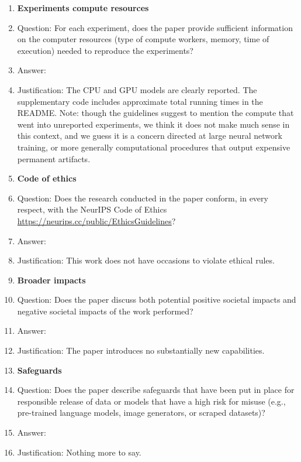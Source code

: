 \begin{enumerate}
	\item {\bf Experiments compute resources}
	\item[] Question: For each experiment, does the paper provide sufficient information on the computer resources (type of compute workers, memory, time of execution) needed to reproduce the experiments?
	\item[] Answer: \answerYes{} %
	\item[] Justification: The CPU and GPU models are clearly reported. The
	      supplementary code includes approximate total running times in the README.
	      Note: though the guidelines suggest to mention the compute that went into
	      unreported experiments, we think it does not make much sense in this
	      context, and we guess it is a concern directed at large neural network
	      training, or more generally computational procedures that output expensive
	      permanent artifacts.

	\item {\bf Code of ethics}
	\item[] Question: Does the research conducted in the paper conform, in every respect, with the NeurIPS Code of Ethics \url{https://neurips.cc/public/EthicsGuidelines}?
	\item[] Answer: \answerYes{} %
	\item[] Justification: This work does not have occasions to violate ethical rules.

	\item {\bf Broader impacts}
	\item[] Question: Does the paper discuss both potential positive societal impacts and negative societal impacts of the work performed?
	\item[] Answer: \answerNo{} %
	\item[] Justification: The paper introduces no substantially new capabilities.

	\item {\bf Safeguards}
	\item[] Question: Does the paper describe safeguards that have been put in place for responsible release of data or models that have a high risk for misuse (e.g., pre-trained language models, image generators, or scraped datasets)?
	\item[] Answer: \answerNA{} %
	\item[] Justification: Nothing more to say.


\end{enumerate}
